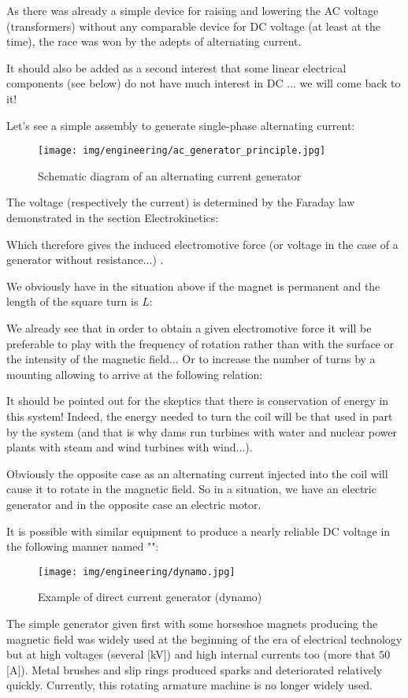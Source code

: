 	As there was already a simple device for raising and lowering the AC voltage (transformers) without any comparable device for DC voltage (at least at the time), the race was won by the adepts of alternating current.

	It should also be added as a second interest that some linear electrical components (see below) do not have much interest in DC ... we will come back to it!

	Let's see a simple assembly to generate single-phase alternating current:
	\begin{figure}[H]
		\centering
		\texttt{[image: img/engineering/ac\_generator\_principle.jpg]}
		\caption{Schematic diagram of an alternating current generator}
	\end{figure}
	The voltage (respectively the current) is determined by the Faraday law demonstrated in the section Electrokinetics:
	
	Which therefore gives the induced electromotive force (or voltage in the case of a generator without resistance...) .

	We obviously have in the situation above if the magnet is permanent and the length of the square turn is $L$:
	
	We already see that in order to obtain a given electromotive force it will be preferable to play with the frequency of rotation rather than with the surface or the intensity of the magnetic field... Or to increase the number of turns by a mounting allowing to arrive at the following relation:
	
	It should be pointed out for the skeptics that there is conservation of energy in this system! Indeed, the energy needed to turn the coil will be that used in part by the system (and that is why dams run turbines with water and nuclear power plants with steam and wind turbines with wind...).
	
	Obviously the opposite case as an alternating current injected into the coil will cause it to rotate in the magnetic field. So in a situation, we have an electric generator and in the opposite case an electric motor.

	It is possible with similar equipment to produce a nearly reliable DC voltage in the following manner named "":
	\begin{figure}[H]
		\centering
		\texttt{[image: img/engineering/dynamo.jpg]}
		\caption{Example of direct current generator (dynamo)}
	\end{figure}
	The simple generator given first with some horseshoe magnets producing the magnetic field was widely used at the beginning of the era of electrical technology but at high voltages (several [kV]) and high internal currents too (more that $50$ [A]). Metal brushes and slip rings produced sparks and deteriorated relatively quickly. Currently, this rotating armature machine is no longer widely used.

